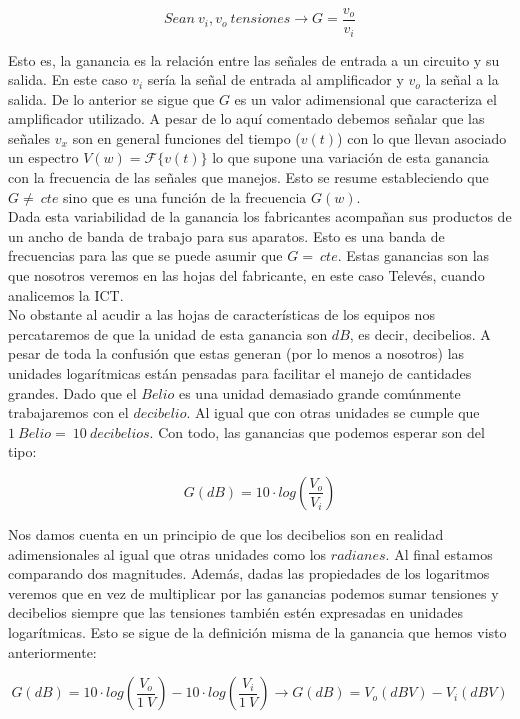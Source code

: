 \documentclass{article}[12 pt]
\begin{document}
			$$Sean\ v_i, v_o\ tensiones \rightarrow G = \frac{v_o}{v_i}$$

			Esto es, la ganancia es la relación entre las señales de entrada a un circuito y su salida. En este caso $v_i$ sería la señal de entrada al amplificador y $v_o$ la señal a la salida. De lo anterior se sigue que $G$ es un valor adimensional que caracteriza el amplificador utilizado. A pesar de lo aquí comentado debemos señalar que las señales $v_x$ son en general funciones del tiempo ($v(t)$) con lo que llevan asociado un espectro $V(w) = \mathcal{F}\{v(t)\}$ lo que supone una variación de esta ganancia con la frecuencia de las señales que manejos. Esto se resume estableciendo que $G \neq\ cte$ sino que es una función de la frecuencia $G(w)$.\\

			Dada esta variabilidad de la ganancia los fabricantes acompañan sus productos de un ancho de banda de trabajo para sus aparatos. Esto es una banda de frecuencias para las que se puede asumir que $G =\ cte$. Estas ganancias son las que nosotros veremos en las hojas del fabricante, en este caso Televés, cuando analicemos la ICT.\\

			No obstante al acudir a las hojas de características de los equipos nos percataremos de que la unidad de esta ganancia son $dB$, es decir, decibelios. A pesar de toda la confusión que estas generan (por lo menos a nosotros) las unidades logarítmicas están pensadas para facilitar el manejo de cantidades grandes. Dado que el $Belio$ es una unidad demasiado grande comúnmente trabajaremos con el $decibelio$. Al igual que con otras unidades se cumple que $1\ Belio =\ 10\ decibelios$. Con todo, las ganancias que podemos esperar son del tipo:

			$$G(dB) = 10 \cdot log(\frac{V_o}{V_i})$$

			Nos damos cuenta en un principio de que los decibelios son en realidad adimensionales al igual que otras unidades como los $radianes$. Al final estamos comparando dos magnitudes. Además, dadas las propiedades de los logaritmos veremos que en vez de multiplicar por las ganancias podemos sumar tensiones y decibelios siempre que las tensiones también estén expresadas en unidades logarítmicas. Esto se sigue de la definición misma de la ganancia que hemos visto anteriormente:

			$$G(dB) = 10 \cdot log(\frac{V_o}{1\ V}) - 10 \cdot log(\frac{V_i}{1\ V}) \rightarrow G(dB) = V_o(dBV) - V_i(dBV)$$
\end{document}
